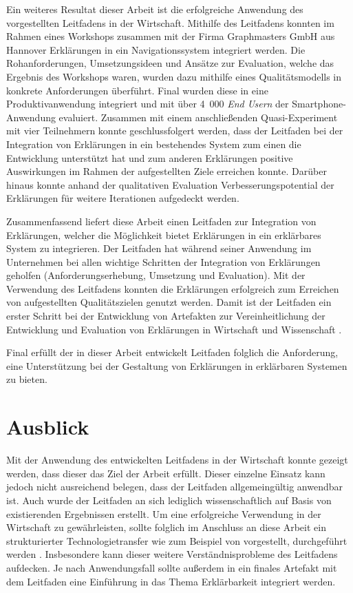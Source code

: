 Ein weiteres Resultat dieser Arbeit ist die erfolgreiche Anwendung des vorgestellten Leitfadens in der Wirtschaft. Mithilfe des Leitfadens konnten im Rahmen eines Workshops zusammen mit der Firma Graphmasters GmbH aus Hannover Erklärungen in ein Navigationssystem integriert werden. Die Rohanforderungen, Umsetzungsideen und Ansätze zur Evaluation, welche das Ergebnis des Workshops waren, wurden dazu mithilfe eines Qualitätsmodells in konkrete Anforderungen überführt. Final wurden diese in eine Produktivanwendung integriert und mit über 4~000 \textit{End Usern} der Smartphone-Anwendung evaluiert. Zusammen mit einem anschließenden Quasi-Experiment mit vier Teilnehmern konnte geschlussfolgert werden, dass der Leitfaden bei der Integration von Erklärungen in ein bestehendes System zum einen die Entwicklung unterstützt hat und zum anderen Erklärungen positive Auswirkungen im Rahmen der aufgestellten Ziele erreichen konnte. Darüber hinaus konnte anhand der qualitativen Evaluation Verbesserungspotential der Erklärungen für weitere Iterationen aufgedeckt werden.

\newpage

Zusammenfassend liefert diese Arbeit einen Leitfaden zur Integration von Erklärungen, welcher die Möglichkeit bietet Erklärungen in ein erklärbares System zu integrieren. Der Leitfaden hat während seiner Anwendung im Unternehmen bei allen wichtige Schritten der Integration von Erklärungen geholfen (Anforderungserhebung, Umsetzung und Evaluation). Mit der Verwendung des Leitfadens konnten die Erklärungen erfolgreich zum Erreichen von aufgestellten Qualitätszielen genutzt werden. Damit ist der Leitfaden ein erster Schritt bei der Entwicklung von Artefakten zur Vereinheitlichung der Entwicklung und Evaluation von Erklärungen in Wirtschaft und Wissenschaft \cite{kohl_explainability_2019,lim_2009_assessing,sokol_explainability_2020}.

Final erfüllt der in dieser Arbeit entwickelt Leitfaden folglich die Anforderung, eine Unterstützung bei der Gestaltung von Erklärungen in erklärbaren Systemen zu bieten.

\section{Ausblick}

Mit der Anwendung des entwickelten Leitfadens in der Wirtschaft konnte gezeigt werden, dass dieser das Ziel der Arbeit erfüllt. Dieser einzelne Einsatz kann jedoch nicht ausreichend belegen, dass der Leitfaden allgemeingültig anwendbar ist. Auch wurde der Leitfaden an sich lediglich wissenschaftlich auf Basis von existierenden Ergebnissen erstellt. Um eine erfolgreiche Verwendung in der Wirtschaft zu gewährleisten, sollte folglich im Anschluss an diese Arbeit ein strukturierter Technologietransfer wie zum Beispiel von \citeauthor{4012630} vorgestellt, durchgeführt werden \cite{4012630}. Insbesondere kann dieser weitere Verständnisprobleme des Leitfadens aufdecken. Je nach Anwendungsfall sollte außerdem in ein finales Artefakt mit dem Leitfaden eine Einführung in das Thema Erklärbarkeit integriert werden.

